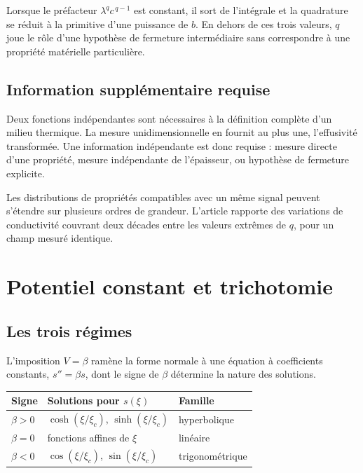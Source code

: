\documentclass[11pt,a4paper]{article}
\begin{document}
Lorsque le préfacteur $\lambda^{q}c^{\,q-1}$ est constant, il sort de l'intégrale et la quadrature se
réduit à la primitive d'une puissance de $b$. En dehors de ces trois valeurs, $q$ joue le rôle d'une
hypothèse de fermeture intermédiaire sans correspondre à une propriété matérielle particulière.

\subsection{Information supplémentaire requise}

Deux fonctions indépendantes sont nécessaires à la définition complète d'un milieu thermique. La mesure
unidimensionnelle en fournit au plus une, l'effusivité transformée. Une information indépendante est
donc requise : mesure directe d'une propriété, mesure indépendante de l'épaisseur, ou hypothèse de
fermeture explicite.

Les distributions de propriétés compatibles avec un même signal peuvent s'étendre sur plusieurs ordres
de grandeur. L'article rapporte des variations de conductivité couvrant deux décades entre les valeurs
extrêmes de $q$, pour un champ mesuré identique.

\section{Potentiel constant et trichotomie}

\subsection{Les trois régimes}

L'imposition $V = \beta$ ramène la forme normale à une équation à coefficients constants,
$s'' = \beta s$, dont le signe de $\beta$ détermine la nature des solutions.

\begin{center}
\begin{tabular}{@{}lll@{}}
\toprule
Signe & Solutions pour $s(\xi)$ & Famille \\
\midrule
$\beta > 0$ & $\cosh(\xi/\xi_{c})$, $\sinh(\xi/\xi_{c})$ & hyperbolique \\
$\beta = 0$ & fonctions affines de $\xi$ & linéaire \\
$\beta < 0$ & $\cos(\xi/\xi_{c})$, $\sin(\xi/\xi_{c})$ & trigonométrique \\
\bottomrule
\end{tabular}
\end{center}
\end{document}
